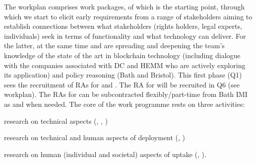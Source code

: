 The workplan comprises  work packages, of which  is the starting point, through which we start to elicit early requirements from a range of stakeholders aiming to establish connections between what stakeholders (rights holders, legal experts, individuals) seek in terms of functionality and what technology can deliver.  For the latter, at the same time  and  are spreading and deepening the team's knowledge of the state of the art in blockchain technology (including dialogue with the companies associated with DC and HEMM who are actively exploring its application) and policy reasoning (Bath and Bristol).  This first phase (Q1) sees the recruitment of RAs for \wpref{\WPCrypto} and \wpref{\WPTools}.  The RA for \wpref{\WPCloud} will be recruited in Q6 (see workplan).  The RAs for  can be subcontracted flexibly/part-time from Bath IMI as and when needed.
%
The core of the work programme rests on three activities:
\begin{inparaenum}[(i)]
\item research on technical aspects (\wpref{\WPCrypto}, \wpref{\WPTools}, \wpref{\WPCloud})
\item research on technical and human aspects of deployment (\wpref{\WPCloud}, \wpref{\WPUser})
\item research on human (individual and societal) aspects of uptake (\wpref{\WPMaths}, \wpref{\WPUser}).
\end{inparaenum}
